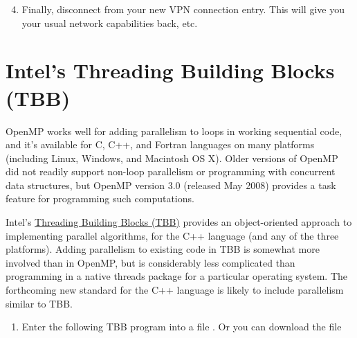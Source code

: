 \documentclass[letterpaper,10pt,openany,oneside]{sphinxmanual}
\begin{document}
\begin{enumerate}
\setcounter{enumi}{3}
\item {} 
Finally, disconnect from your new VPN connection entry. This will give you your usual network capabilities back, etc.

\end{enumerate}


\chapter{Intel's Threading Building Blocks (TBB)}
\label{TBB/TBB:intel-s-threading-building-blocks-tbb}\label{TBB/TBB::doc}\label{TBB/TBB:university-of-ghent-page}
OpenMP works well for adding parallelism to loops in working sequential code, and it's available for C, C++, and Fortran languages on many platforms (including Linux, Windows, and Macintosh OS X). Older versions of OpenMP did not readily support non-loop parallelism or programming with concurrent data structures, but OpenMP version 3.0 (released May 2008) provides a task feature for programming such computations.

Intel's \href{http://threadingbuildingblocks.org/}{Threading Building Blocks (TBB)} provides an object-oriented approach to implementing parallel algorithms, for the C++ language (and any of the three platforms). Adding parallelism to existing code in TBB is somewhat more involved than in OpenMP, but is considerably less complicated than programming in a native threads package for a particular operating system. The forthcoming new standard for the C++ language is likely to include parallelism similar to TBB.
\begin{enumerate}
\item {} 
Enter the following TBB program into a file . Or you can download the file 

\end{enumerate}
\end{document}
